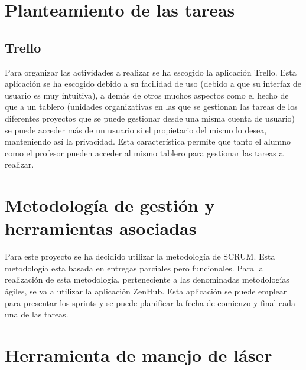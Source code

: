 \section{Planteamiento de las tareas}

\subsection{Trello}
Para organizar las actividades a realizar se ha escogido la aplicación Trello. Esta aplicación se ha escogido debido a su facilidad de uso (debido a que su interfaz de usuario es muy intuitiva), a demás de otros muchos aspectos como el hecho de que a un tablero (unidades organizativas en las que se gestionan las tareas de los diferentes proyectos que se puede gestionar desde una misma cuenta de usuario) se puede acceder más de un usuario si el propietario del mismo lo desea, manteniendo así la privacidad. Esta característica permite que tanto el alumno como el profesor pueden acceder al mismo tablero para gestionar las tareas a realizar.\\

\section{Metodología de gestión y herramientas asociadas}

Para este proyecto se ha decidido utilizar la metodología de SCRUM. Esta metodología esta basada en entregas parciales pero funcionales. Para la realización de esta metodología, perteneciente a las denominadas metodologías ágiles, se va a utilizar la aplicación ZenHub. Esta aplicación se puede emplear para presentar los sprints y se puede planificar la fecha de comienzo y final cada una de las tareas.

\section{Herramienta de manejo de láser}


